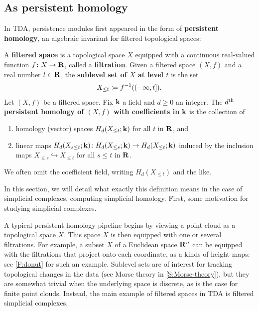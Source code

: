 \subsection{As persistent homology}

In TDA, persistence modules first appeared in the form of \textbf{persistent homology}, an algebraic invariant for filtered topological spaces:

\begin{definition}
  A \textbf{filtered space} is a topological space $X$ equipped with a continuous real-valued function $f \colon X \to \mathbf{R}$, called a \textbf{filtration}. Given a filtered space $(X, f)$ and a real number $t \in \mathbf{R}$, the \textbf{sublevel set of $X$ at level $t$} is the set
  \[
    X_{\leq t} \coloneq f^{-1}((-\infty, t]). \index{.a xt@$X_{\leq t}$}
  \]
  Let $(X, f)$ be a filtered space. Fix $\mathbf{k}$ a field and $d \geq 0$ an integer. The \textbf{$d^{\text{th}}$ persistent homology of $(X, f)$ with coefficients in $\mathbf{k}$} is the collection of
  \begin{enumerate}
    \item homology (vector) spaces $H_d(X_{\leq t}; \mathbf{k})$ for all $t$ in $\mathbf{R}$, and
    \item linear maps $H_d(X_{s \leq t}; \mathbf{k}) \colon H_d(X_{\leq s}; \mathbf{k}) \to H_d(X_{\leq t}; \mathbf{k})$ induced by the inclusion maps $X_{\leq s} \hookrightarrow X_{\leq t}$ for all $s \leq t$ in $\mathbf{R}$.
  \end{enumerate}
  We often omit the coefficient field, writing $H_d(X_{\leq t})$ and the like.
\end{definition}

In this section, we will detail what exactly this definition means in the case of simplicial complexes, computing simplicial homology. First, some motivation for studying simplicial complexes.

A typical persistent homology pipeline begins by viewing a point cloud as a topological space $X$. This space $X$ is then equipped with one or several filtrations. For example, a subset $X$ of a Euclidean space $\mathbf{R}^n$ can be equipped with the filtrations that project onto each coordinate, as a kinds of height maps: see \cref{F:donut} for such an example.
Sublevel sets are of interest for tracking topological changes in the data (see Morse theory in \cref{S:Morse-theory}), but they are somewhat trivial when the underlying space is discrete, as is the case for finite point clouds.
Instead, the main example of filtered spaces in TDA is filtered simplicial complexes.


